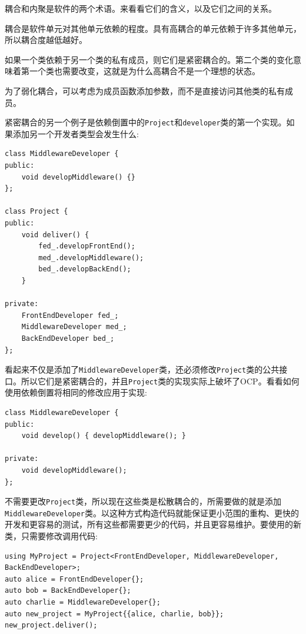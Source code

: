 
耦合和内聚是软件的两个术语。来看看它们的含义，以及它们之间的关系。



耦合是软件单元对其他单元依赖的程度。具有高耦合的单元依赖于许多其他单元，所以耦合度越低越好。

如果一个类依赖于另一个类的私有成员，则它们是紧密耦合的。第二个类的变化意味着第一个类也需要改变，这就是为什么高耦合不是一个理想的状态。

为了弱化耦合，可以考虑为成员函数添加参数，而不是直接访问其他类的私有成员。

紧密耦合的另一个例子是依赖倒置中的\texttt{Project}和\texttt{developer}类的第一个实现。如果添加另一个开发者类型会发生什么:


\begin{lstlisting}[style=styleCXX]
class MiddlewareDeveloper {
public:
	void developMiddleware() {}
};

class Project {
public:
	void deliver() {
		fed_.developFrontEnd();
		med_.developMiddleware();
		bed_.developBackEnd();
	}

private:
	FrontEndDeveloper fed_;
	MiddlewareDeveloper med_;
	BackEndDeveloper bed_;
};
\end{lstlisting}

看起来不仅是添加了\texttt{MiddlewareDeveloper}类，还必须修改\texttt{Project}类的公共接口。所以它们是紧密耦合的，并且\texttt{Project}类的实现实际上破坏了OCP。看看如何使用依赖倒置将相同的修改应用于实现:


\begin{lstlisting}[style=styleCXX]
class MiddlewareDeveloper {
public:
	void develop() { developMiddleware(); }
	
private:
	void developMiddleware();
};
\end{lstlisting}

不需要更改\texttt{Project}类，所以现在这些类是松散耦合的，所需要做的就是添加\texttt{MiddlewareDeveloper}类。以这种方式构造代码就能保证更小范围的重构、更快的开发和更容易的测试，所有这些都需要更少的代码，并且更容易维护。要使用的新类，只需要修改调用代码:

\begin{lstlisting}[style=styleCXX]
using MyProject = Project<FrontEndDeveloper, MiddlewareDeveloper,
BackEndDeveloper>;
auto alice = FrontEndDeveloper{};
auto bob = BackEndDeveloper{};
auto charlie = MiddlewareDeveloper{};
auto new_project = MyProject{{alice, charlie, bob}};
new_project.deliver();
\end{lstlisting}

